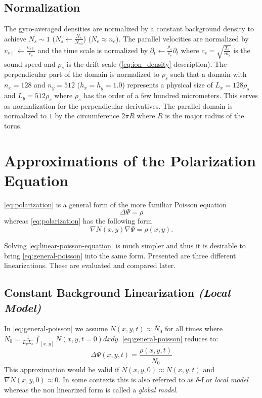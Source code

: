 \documentclass[master.tex]{subfiles}
\begin{document}
\subsection{Normalization}
The gyro-averaged densities are normalized by a constant background density to achieve $N_s \sim 1$ ($N_s \leftarrow \frac{N_s}{N_{s0}}$) ($N_e \approx n_e$). The parallel velocities are normalized by $v_{s\parallel} \leftarrow \frac{v_{s\parallel}}{c_s}$ and the time scale is normalized by $\partial_t \leftarrow \frac{\rho_s}{c_s}\partial_t$ where $c_s = \sqrt{\frac{T_e}{m_i}}$ is the sound speed and $\rho_s$ is the drift-scale (\autoref{eq:ion_density} description). The perpendicular part of the domain is normalized to $\rho_s$ such that a domain with $n_x=128$ and $n_y=512$ ($h_x=h_y=1.0$) represents a physical size of $L_x=128\rho_s$ and $L_y=512\rho_s$ where $\rho_s$ has the order of a few hundred micrometers. This serves as normalization for the perpendicular derivatives. The parallel domain is normalized to $1$ by the circumference $2\pi R$ where $R$ is the major radius of the torus.


\section{Approximations of the Polarization Equation} \label{sec:polarization-linearizations}
\autoref{eq:polarization} is a general form of the more familiar Poisson equation
\begin{equation}\label{eq:linear-poisson-equation}
    \Delta \Psi = \rho 
\end{equation}
whereas \autoref{eq:polarization} has the following form
\begin{equation}\label{eq:general-poisson}
    \nabla N(x,y) \nabla \Psi = \rho(x,y).
\end{equation}

Solving \autoref{eq:linear-poisson-equation} is much simpler and thus it is desirable to bring \autoref{eq:general-poisson} into the same form. Presented are three different linearizations. These are evaluated and compared later.

\subsection{Constant Background Linearization \textit{(Local Model)}}

In \autoref{eq:general-poisson} we assume $N(x,y, t) \approx \overline{N}_0$ for all times where $\overline{N}_0=\frac{1}{L_yL_x}\int_{[x,y]} N(x,y, t = 0) dx dy$. \autoref{eq:general-poisson} reduces to:
\begin{equation}
    \Delta \Psi(x,y,t) = \frac{\rho(x,y,t)}{\overline{N}_0}
\end{equation}
This approximation would be valid if $N(x,y, 0) \approx N(x,y,t)$ and $\nabla N(x,y,0) \approx 0$. In some contexts this is also referred to as  $\delta$-f or \textit{local model} whereas the non linearized form is called a \textit{global model}.
\end{document}
